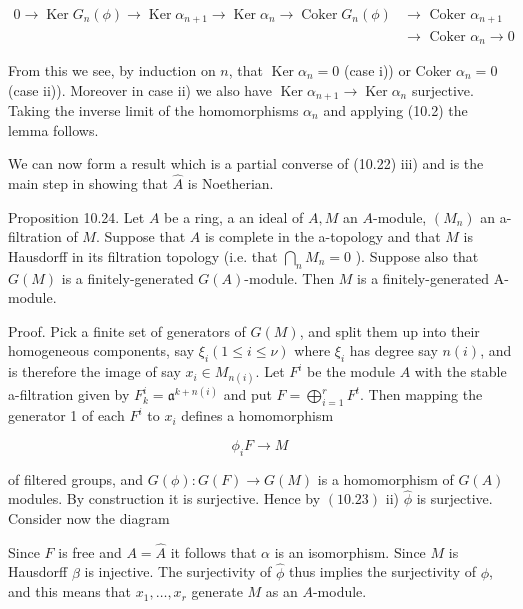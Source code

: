 \documentclass{standalone}
\theoremstyle{definition}
\theoremstyle{remark}
\begin{document}
\[
\begin{aligned}
0 \rightarrow \operatorname{Ker} G_{n}(\phi) \rightarrow \operatorname{Ker} \alpha_{n+1} \rightarrow \operatorname{Ker} \alpha_{n} \rightarrow \operatorname{Coker} G_{n}(\phi) & \rightarrow \text { Coker } \alpha_{n+1} \\
& \rightarrow \text { Coker } \alpha_{n} \rightarrow 0
\end{aligned}
\]

From this we see, by induction on $n$, that $\operatorname{Ker} \alpha_{n}=0$ (case i)) or Coker $\alpha_{n}=0$ (case ii)). Moreover in case ii) we also have $\operatorname{Ker} \alpha_{n+1} \rightarrow \operatorname{Ker} \alpha_{n}$ surjective. Taking the inverse limit of the homomorphisms $\alpha_{n}$ and applying (10.2) the lemma follows.

We can now form a result which is a partial converse of (10.22) iii) and is the main step in showing that $\hat{A}$ is Noetherian.

Proposition 10.24. Let $A$ be a ring, a an ideal of $A, M$ an $A$-module, $\left(M_{n}\right)$ an a-filtration of $M$. Suppose that $A$ is complete in the a-topology and that $M$ is Hausdorff in its filtration topology (i.e. that $\bigcap_{n} M_{n}=0$ ). Suppose also that $G(M)$ is a finitely-generated $G(A)$-module. Then $M$ is a finitely-generated A-module.

Proof. Pick a finite set of generators of $G(M)$, and split them up into their homogeneous components, say $\xi_{i}(1 \leqslant i \leqslant \nu)$ where $\xi_{i}$ has degree say $n(i)$, and is therefore the image of say $x_{i} \in M_{n(i)}$. Let $F^{i}$ be the module $A$ with the stable a-filtration given by $F_{k}^{i}=\mathfrak{a}^{k+n(i)}$ and put $F=\bigoplus_{i=1}^{r} F^{t}$. Then mapping the generator 1 of each $F^{i}$ to $x_{i}$ defines a homomorphism

\[
\phi_{i} F \rightarrow M
\]

of filtered groups, and $G(\phi): G(F) \rightarrow G(M)$ is a homomorphism of $G(A)$ modules. By construction it is surjective. Hence by $(10.23)$ ii) $\hat{\phi}$ is surjective. Consider now the diagram

\begin{center}
\end{center}

Since $F$ is free and $A=\hat{A}$ it follows that $\alpha$ is an isomorphism. Since $M$ is Hausdorff $\beta$ is injective. The surjectivity of $\hat{\phi}$ thus implies the surjectivity of $\phi$, and this means that $x_{1}, \ldots, x_{r}$ generate $M$ as an $A$-module.
\end{document}

